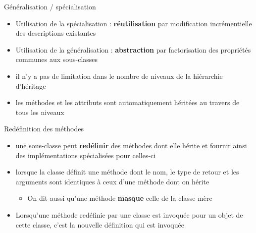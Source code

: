 \begin{frame}{Généralisation / spécialisation}
\begin{itemize}
	\item Utilisation de la spécialisation : \textbf{réutilisation} par modification incrémentielle des descriptions existantes
	\item Utilisation de la généralisation : \textbf{abstraction} par factorisation des propriétés communes aux sous-classes
	\item il n'y a pas de limitation dans le nombre de niveaux de la hiérarchie d'héritage
	\item les méthodes et les attributs sont automatiquement héritées au travers de tous les niveaux
\end{itemize}
\end{frame}


\begin{frame}{Redéfinition des méthodes}
\begin{itemize}
	\item une sous-classe peut \textbf{redéfinir} des méthodes dont elle hérite et fournir ainsi des implémentations spécialisées pour celles-ci
	\item lorsque la classe définit une méthode dont le nom, le type de retour et les arguments sont identiques à ceux d'une méthode dont on hérite
	\begin{itemize}
	\item On dit aussi qu'une méthode \textbf{masque} celle de la classe mère
	\end{itemize}
	\item Lorsqu'une méthode redéfinie par une classe est invoquée pour un objet de cette classe, c'est la nouvelle définition qui est invoquée
\end{itemize}
\end{frame}

